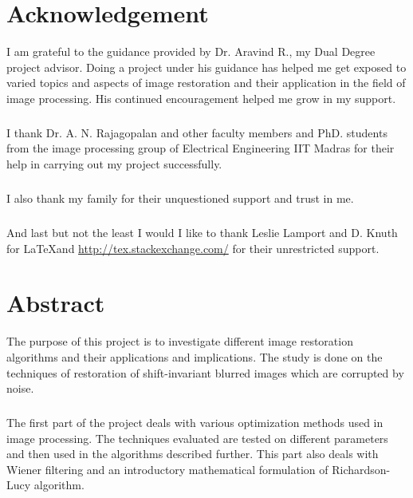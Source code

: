 \documentclass[a4paper]{book}
\begin{document}
	\captionsetup{justification=centering}
	
\frontmatter
%

\chapter[\LARGE Acknowledgement]{Acknowledgement}
\thispagestyle{empty}
I am grateful to the guidance provided by Dr. Aravind R., my Dual Degree project advisor. Doing a project under his guidance has helped me get exposed to varied topics and aspects of image restoration and their application in the field of image processing. His continued encouragement helped me grow in my support.

\paragraph*{}I thank Dr. A. N. Rajagopalan and other faculty members and PhD. students from the image processing group of Electrical Engineering IIT Madras for their help in carrying out my project successfully.
\paragraph*{}I also thank my family for their unquestioned support and trust in me.
\paragraph*{}And last but not the least I would I like to thank Leslie Lamport and D. Knuth for \LaTeX  and \url{http://tex.stackexchange.com/} for their unrestricted support.
\cleardoublepage
\chapter[\LARGE Abstract]{Abstract}
\thispagestyle{empty}
The purpose of this project is to investigate different image restoration algorithms and their applications and implications. The study is done on the techniques of restoration of shift-invariant blurred images which are corrupted by noise.
\paragraph*{}The first part of the project deals with various optimization methods used in image processing. The techniques evaluated are tested on different parameters and then used in the algorithms described further. This part also deals with Wiener filtering and an introductory mathematical formulation of Richardson-Lucy algorithm.
\end{document}
